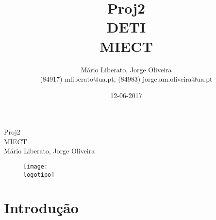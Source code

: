 \documentclass{report}
\begin{document}
%
%
\def\titulo{Proj2}
\def\data{12-06-2017}
\def\autores{Mário Liberato, Jorge Oliveira}
\def\autorescontactos{(84917) mliberato@ua.pt, (84983) jorge.am.oliveira@ua.pt}
\def\departamento{DETI}
\def\curso{MIECT}
\def\logotipo{ua.pdf}
%
%
\begin{titlepage}

\begin{center}
%
\vspace*{50mm}
%
{\Huge \titulo}\\ 
%
\vspace{10mm}
%
{\Large \curso}\\
%
\vspace{10mm}
%
{\LARGE \autores}\\ 
%
\vspace{30mm}
%
\begin{figure}[h]
\center
\texttt{[image: \\logotipo]}
\end{figure}
%
\vspace{30mm}
\end{center}
%
\end{titlepage}

\title{%
{\Huge\textbf{\titulo}}\\
{\Large \departamento\\ \curso}
}
%
\author{%
    \autores \\
    \autorescontactos
}
%
\date{\data}
%
\maketitle


\begin{abstract}

\end{abstract}


\tableofcontents


%
\clearpage
{} %
%
\chapter{Introdução}
\label{chap.introducao} 
\end{document}

